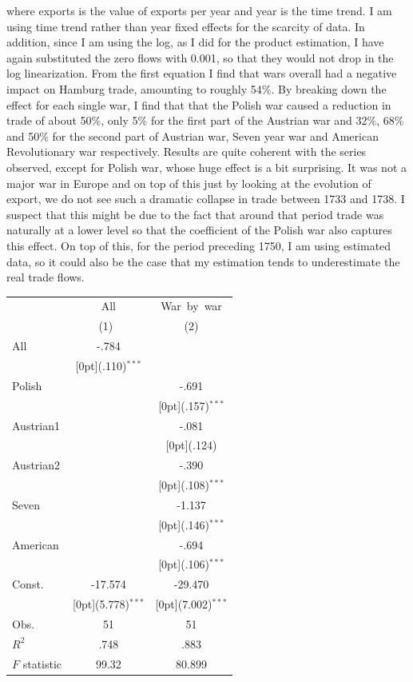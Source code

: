 \documentclass[12pt,a4paper,titlepage]{article}
\begin{document}
where exports  is the value of exports per year and year is the time trend. I am using time trend rather than year fixed effects for the scarcity of data. In addition, since I am using the log, as I did for the product estimation, I have again substituted the zero flows with 0.001, so that they would not drop in the log linearization.
From the first equation I find that wars overall had a negative impact on Hamburg trade, amounting to roughly 54\%. By breaking down the effect for each single war, I find that that the Polish war caused a reduction in trade of about 50\%, only 5\% for the first part of the Austrian war and 32\%, 68\% and 50\% for the second part of Austrian war, Seven year war and American Revolutionary war respectively. Results are quite coherent with the series observed, except for Polish war, whose huge effect is a bit surprising. It was not a major war in Europe and on top of this just by looking at the evolution of export, we do not see such a dramatic collapse in trade between 1733 and 1738. I suspect that this might be due to the fact that around that period trade was naturally at a lower level so that 
the coefficient of the Polish war also captures this effect. On top of this, for the period preceding 1750, I am using estimated data, so it could also be the case that my estimation tends to underestimate the real trade flows.
 \label{tab:title} 
\begin{tabular*}{\textwidth}{@{\extracolsep{\fill}}lcc}		
	& \multicolumn{1}{c}{All} &	\multicolumn{1}{c}{War~by~war} \\
\cline{2-3}		
	& \multicolumn{1}{c}{(1)\mbox{\ }} &	\multicolumn{1}{c}{(2)} \\
\hline		
All &	-.784 &	\\
&	\raisebox{.7ex}[0pt]{\scriptsize (.110)$^{***}$} &	\\
Polish &	&	-.691 \\
&	&	\raisebox{.7ex}[0pt]{\scriptsize (.157)$^{***}$} \\
Austrian1 &	&	-.081 \\
&	&	\raisebox{.7ex}[0pt]{\scriptsize (.124)} \\
Austrian2 &	&	-.390 \\
&	&	\raisebox{.7ex}[0pt]{\scriptsize (.108)$^{***}$} \\
Seven &	&	-1.137 \\
&	&	\raisebox{.7ex}[0pt]{\scriptsize (.146)$^{***}$} \\
American &	&	-.694 \\
&	&	\raisebox{.7ex}[0pt]{\scriptsize (.106)$^{***}$} \\
Const. &	-17.574 &	-29.470 \\
&	\raisebox{.7ex}[0pt]{\scriptsize (5.778)$^{***}$} &	\raisebox{.7ex}[0pt]{\scriptsize (7.002)$^{***}$} \\
Obs. &	51 &	51 \\
$ R^2$ &	.748 &	.883 \\
$ F$ statistic &	99.32 &	80.899 \\
\hline\hline		
\end{tabular*}\\~\\
\end{document}
